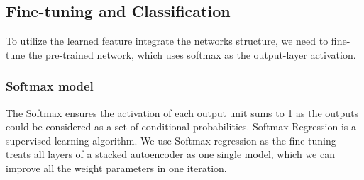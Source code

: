 \documentclass[journal]{IEEEtran}
\begin{document}
\subsection{Fine-tuning and Classification}
To utilize the learned feature integrate the networks structure, we need to fine-tune the pre-trained network, which uses softmax as the output-layer activation. 

\subsubsection{Softmax model}The Softmax ensures the activation of each output unit sums to 1 as the outputs could be considered as a set of conditional probabilities. Softmax Regression is a supervised learning algorithm. We use Softmax regression as the fine tuning treats all layers of a stacked autoencoder as one single model, which we can improve all the weight parameters in one iteration. 
\end{document}
